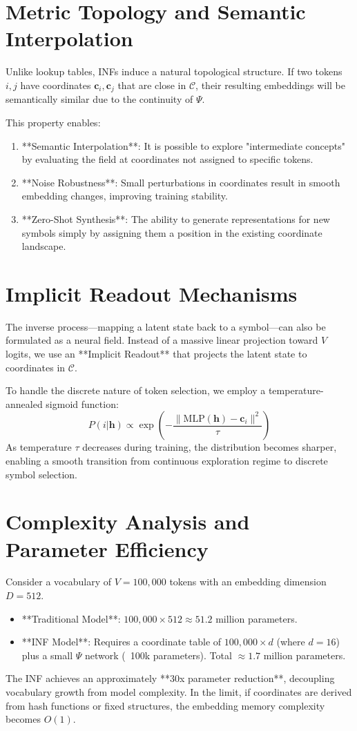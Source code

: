 \documentclass[11pt,a4paper]{report}
\begin{document}
\section{Metric Topology and Semantic Interpolation}
Unlike lookup tables, INFs induce a natural topological structure. If two tokens $i, j$ have coordinates $\mathbf{c}_i, \mathbf{c}_j$ that are close in $\mathcal{C}$, their resulting embeddings will be semantically similar due to the continuity of $\Psi$.

This property enables:
\begin{enumerate}
    \item **Semantic Interpolation**: It is possible to explore "intermediate concepts" by evaluating the field at coordinates not assigned to specific tokens.
    \item **Noise Robustness**: Small perturbations in coordinates result in smooth embedding changes, improving training stability.
    \item **Zero-Shot Synthesis**: The ability to generate representations for new symbols simply by assigning them a position in the existing coordinate landscape.
\end{enumerate}

\section{Implicit Readout Mechanisms}
The inverse process—mapping a latent state back to a symbol—can also be formulated as a neural field. Instead of a massive linear projection toward $V$ logits, we use an **Implicit Readout** that projects the latent state to coordinates in $\mathcal{C}$.

To handle the discrete nature of token selection, we employ a temperature-annealed sigmoid function:
\begin{equation}
    P(i | \mathbf{h}) \propto \exp\left( -\frac{\| \text{MLP}(\mathbf{h}) - \mathbf{c}_i \|^2}{\tau} \right)
\end{equation}
As temperature $\tau$ decreases during training, the distribution becomes sharper, enabling a smooth transition from continuous exploration regime to discrete symbol selection.

\section{Complexity Analysis and Parameter Efficiency}
Consider a vocabulary of $V = 100,000$ tokens with an embedding dimension $D = 512$.
\begin{itemize}
    \item **Traditional Model**: $100,000 \times 512 \approx 51.2$ million parameters.
    \item **INF Model**: Requires a coordinate table of $100,000 \times d$ (where $d=16$) plus a small $\Psi$ network (~100k parameters). Total $\approx 1.7$ million parameters.
\end{itemize}
The INF achieves an approximately **30x parameter reduction**, decoupling vocabulary growth from model complexity. In the limit, if coordinates are derived from hash functions or fixed structures, the embedding memory complexity becomes $O(1)$.
\end{document}
